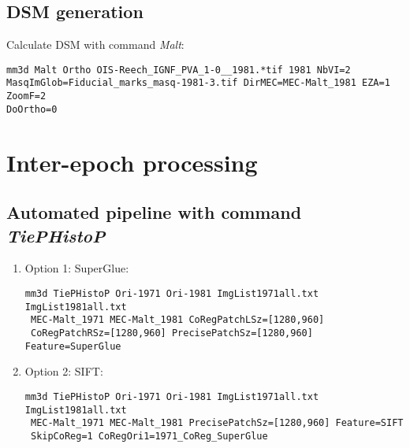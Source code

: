 \subsection{DSM generation}
Calculate \ac{DSM} with command \textit{Malt}:\\
\begin{verbatim}
mm3d Malt Ortho OIS-Reech_IGNF_PVA_1-0__1981.*tif 1981 NbVI=2 
MasqImGlob=Fiducial_marks_masq-1981-3.tif DirMEC=MEC-Malt_1981 EZA=1 ZoomF=2 
DoOrtho=0
\end{verbatim}

\section{Inter-epoch processing}
\subsection{Automated pipeline with command \textit{TiePHistoP}}

\begin{enumerate}

\item{Option 1: SuperGlue:}
\begin{verbatim}
mm3d TiePHistoP Ori-1971 Ori-1981 ImgList1971all.txt ImgList1981all.txt 
 MEC-Malt_1971 MEC-Malt_1981 CoRegPatchLSz=[1280,960]
 CoRegPatchRSz=[1280,960] PrecisePatchSz=[1280,960] Feature=SuperGlue
\end{verbatim}

\item{Option 2: SIFT:}
\begin{verbatim}
mm3d TiePHistoP Ori-1971 Ori-1981 ImgList1971all.txt ImgList1981all.txt 
 MEC-Malt_1971 MEC-Malt_1981 PrecisePatchSz=[1280,960] Feature=SIFT 
 SkipCoReg=1 CoRegOri1=1971_CoReg_SuperGlue
\end{verbatim}
\end{enumerate}

